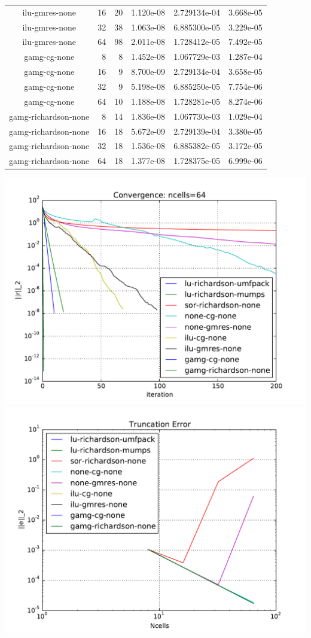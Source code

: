 \documentclass{article}\usepackage[T1]{fontenc}
\begin{document}
\begin{tabular}{crrlll}
ilu-gmres-none&16&20&1.120e-08&2.729134e-04&3.668e-05\\
ilu-gmres-none&32&38&1.063e-08&6.885300e-05&3.229e-05\\
ilu-gmres-none&64&98&2.011e-08&1.728412e-05&7.492e-05\\ \hline
gamg-cg-none&8&8&1.452e-08&1.067729e-03&1.287e-04\\
gamg-cg-none&16&9&8.700e-09&2.729134e-04&3.658e-05\\
gamg-cg-none&32&9&5.198e-08&6.885250e-05&7.754e-06\\
gamg-cg-none&64&10&1.188e-08&1.728281e-05&8.274e-06\\ \hline
gamg-richardson-none&8&14&1.836e-08&1.067730e-03&1.029e-04\\
gamg-richardson-none&16&18&5.672e-09&2.729139e-04&3.380e-05\\
gamg-richardson-none&32&18&1.536e-08&6.885382e-05&3.172e-05\\
gamg-richardson-none&64&18&1.377e-08&1.728375e-05&6.999e-06\\
\hline\end{tabular}

\includegraphics[width=\linewidth]{convergence.pdf}
\includegraphics[width=\linewidth]{Truncation_Error.pdf}
\end{document}
